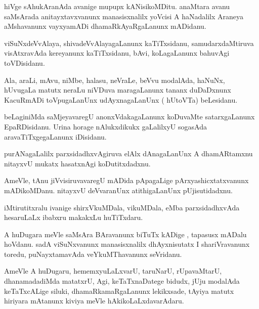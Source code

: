 \documentclass{article}
\begin{document}
\begin{mn}
hiVge sAhukAranAda avanige mupupx kANisikoMDitu. anaMtara avanu saMsArada anitayxtavxvanunx 
manasisxnalilx yoVcisi A haNadalilx Araneya aMshavanunx vayxyamADi dhamaRkAyaRgaLanunx mADidanu.
\end{mn}

\begin{mn}
viSuNxdeVvAlaya, shivadeVvAlayagaLanunx kaTiTxsidanu, samudarxdaMtiruva visAtxravAda kereyanunx 
kaTiTxsidanu, bAvi, koLagaLanunx bahuvAgi toVDisidanu.
\end{mn}

\begin{mn}
Ala, araLi, mAvu, niMbe, halasu, neVraLe, beVvu modalAda, haNuNx, hUvugaLa matutx neraLu niVDuva
maragaLanunx tananx duDaDxnunx KacuRmADi toVpugaLanUnx udAyxnagaLanUnx ( hUtoVTa) beLesidanu.
\end{mn}

\begin{mn}
beLaginiMda saMjeyavaregU anonxVdakagaLanunx koDuvaMte satarxgaLanunx EpaRDisidanu. Urina horage 
nAlukxdikukx gaLalilxyU sogasAda aravaTiTxgegaLanunx iDisidanu.
\end{mn}

\begin{mn}
purANagaLalilx parxsidadhxvAgiruva elAlx dAnagaLanUnx A dhamARtamxnu nitayxvU mukatx hasatxnAgi 
koDutitxdadxnu.
\end{mn}

\begin{mn}
AmeVle, tAnu jiVvisiruvavaregU mADida pApagaLige pArxyashicxtatxvanunx mADikoMDanu. nitayxvU 
deVvaranUnx atithigaLanUnx pUjisutidadxnu.
\end{mn}

\begin{mn}
iMtirutitxralu ivanige shirxVkuMDala, vikuMDala, eMba parxsidadhxvAda hesaruLaLx ibabxru makakxLu 
huTiTxdaru.
\end{mn}

\begin{mn}
A huDugara meVle saMsAra BAravanunx biTuTx kADige , tapasusx mADalu hoVdanu. sadA viSuNxvanunx 
manasisxnalilx dhAyxnisutatx I shariVravanunx toredu, puNayxtamavAda veYkuMThavanunx seVridanu.
\end{mn}

\begin{mn}
AmeVle A huDugaru, hememxyuLaLxvarU, taruNarU, rUpavaMtarU, dhanamadadiMda matatxrU, Agi, 
keTaTxnaDatege bidudx, jUju modalAda keTaTxcALige siluki, dhamaRkamaRgaLanunx lekikxsade, tAyiya
matutx hiriyara mAtanunx kiviya meVle hAkikoLaLxdavarAdaru.
\end{mn}
\end{document}
